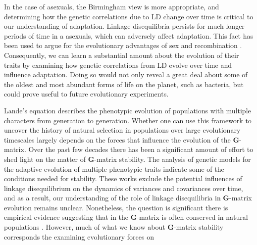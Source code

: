 \documentclass[11pt,twocolumn]{article}
\newcommand{\G}{\textbf{G}}
\begin{document}
In the case of asexuals, the Birmingham view is more appropriate, and determining how the genetic correlations due to LD change over time is critical to our understanding of adaptation. Linkage disequilibria persists for much longer periods of time in a asexuals, which can adversely affect adaptation. This fact has been used to argue for the evolutionary advantages of sex and recombination \citep{Barton2005,Otto2009}. Consequently, we can learn a substantial amount about the evolution of their traits by examining how genetic correlations from LD evolve over time and influence adaptation. Doing so would not only reveal a great deal about some of the oldest and most abundant forms of life on the planet, such as bacteria, but could prove useful to future evolutionary experiments.\par

Lande’s equation describes the phenotypic evolution of populations with multiple characters from generation to generation.  Whether one can use this framework to uncover the history of natural selection in populations over large evolutionary timescales largely depends on the forces that influence the evolution of the \G-matrix.  Over the past few decades there has been a significant amount of effort to shed light on the matter of \G-matrix stability.  The analysis of genetic models for the adaptive evolution of multiple phenotypic traits indicate some of the conditions needed for stability\citep{Turelli1988,Jones2003}.  These works exclude the potential influences of linkage disequilibrium on the dynamics of variances and covariances over time, and as a result, our understanding of the role of linkage disequilibria in \G-matrix evolution remains unclear.  Nonetheless, the question is significant there is empirical evidence suggesting that in the \G-matrix is often conserved in natural populations \citep{Arnold1999,Roff2000,Steppan2002}.  However, much of what we know about \G-matrix stability corresponds the examining evolutionary forces on 
\end{document}
